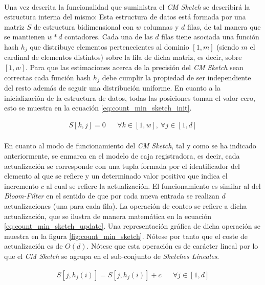 \documentclass{subfiles}
\begin{document}
      \paragraph{}
      Una vez descrita la funcionalidad que suministra el \emph{CM Sketch} se describirá la estructura interna del mismo: Esta estructura de datos está formada por una matriz $S$ de estructura bidimensional con $w$ columnas y $d$ filas, de tal manera que se mantienen $w * d$ contadores. Cada una de las $d$ filas tiene asociada una función hash $h_j$ que distribuye elementos pertenecientes al dominio $[1, m]$ (siendo $m$ el cardinal de elementos distintos) sobre la fila de dicha matriz, es decir, sobre $[1,w]$. Para que las estimaciones acerca de la precisión del \emph{CM Sketch} sean correctas cada función hash $h_j$ debe cumplir la propiedad de ser independiente del resto además de seguir una distribución uniforme. En cuanto a la inicialización de la estructura de datos, todas las posiciones toman el valor cero, esto se muestra en la ecuación \eqref{eq:count_min_sketch_init}.

      \begin{align}
      \label{eq:count_min_sketch_init}
        S[k,j] = 0 && \forall k \in [1,w], \ \forall j \in [1,d]
      \end{align}


      \paragraph{}
      En cuanto al modo de funcionamiento del \emph{CM Sketch}, tal y como se ha indicado anteriormente, se enmarca en el modelo de caja registradora, es decir, cada actualización se corresponde con una tupla formada por el identificador del elemento al que se refiere y un determinado valor positivo que indica el incremento $c$ al cual se refiere la actualización. El funcionamiento es similar al del \emph{Bloom-Filter} en el sentido de que por cada nueva entrada se realizan $d$ actualizaciones (una para cada fila). La operación de conteo se refiere a dicha actualización, que se ilustra de manera matemática en la ecuación \eqref{eq:count_min_sketch_update}. Una representación gráfica de dicha operación se muestra en la figura \ref{fig:count_min_sketch}. Nótese por tanto que el coste de actualización es de $O(d)$. Nótese que esta operación es de carácter lineal por lo que el \emph{CM Sketch} se agrupa en el sub-conjunto de \emph{Sketches Lineales}.

      \begin{align}
      \label{eq:count_min_sketch_update}
        S[j, h_j(i)] = S[j, h_j(i)] + c && \forall j \in [1,d]
      \end{align}
\end{document}
